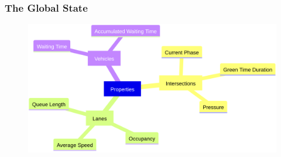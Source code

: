 \documentclass[dvipsnames]{beamer}
\begin{document}
\begin{frame}
\frametitle{The Global State}
  \begin{figure}
    \centering
    \includegraphics[width=1.0\textwidth]{figures/sumo-rf-properties.png}
  \end{figure}
\end{frame}
\end{document}
